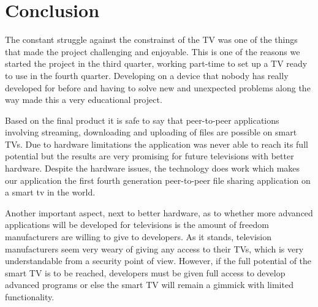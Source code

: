 \chapter{Conclusion}
The constant struggle against the constrainst of the TV was one of the things that made the project challenging and enjoyable. This is one of the reasons we started the project in the third quarter, working part-time to set up a TV ready to use in the fourth quarter. Developing on a device that nobody has really developed for before and having to solve new and unexpected problems along the way made this a very educational project.

Based on the final product it is safe to say that peer-to-peer applications involving streaming, downloading and uploading of files are possible on smart TV\textquotesingle s. Due to hardware limitations the application was never able to reach its full potential but the results are very promising for future televisions with better hardware. Despite the hardware issues, the technology does work which makes our application the first fourth generation peer-to-peer file sharing application on a smart tv in the world.

Another important aspect, next to better hardware, as to whether more advanced applications will be developed for televisions is the amount of freedom manufacturers are willing to give to developers. As it stands, television manufacturers seem very weary of giving any access to their TV\textquotesingle s, which is very understandable from a security point of view. However, if the full potential of the smart TV is to be reached, developers must be given full access to develop advanced programs or else the smart TV will remain a gimmick with limited functionality.
